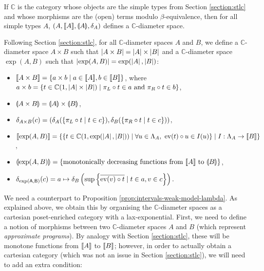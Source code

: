 \begin{example} If $\mathbb{C}$ is the category whose objects are the simple types from Section \ref{section:stlc} and whose morphisms are the (open) terms modulo $\beta$-equivalence, then for all simple types $A$, $(A, \llbracket A \rrbracket, \llparenthesis A \rrparenthesis, \delta_A)$ defines a $\mathbb{C}$-diameter space.
\end{example}

Following Section \ref{section:stlc}, for all $\mathbb{C}$-diameter spaces $A$ and $B$, we define a $\mathbb{C}$-diameter space $A \times B$ such that $\left\vert A \times B\right\vert = \left\vert A\right\vert \times \left\vert B\right\vert$ and a $\mathbb{C}$-diameter space $\exp(A,B)$ such that $\left\vert\exp(A,B)\right\vert = \exp(\left\vert A\right\vert,\left\vert B\right\vert)$: \begin{itemize}
\item $\llbracket A \times B \rrbracket = \{ a \times b \mid a \in \llbracket A \rrbracket, b \in \llbracket B \rrbracket \} $, where $a \times b = \{ t \in \mathbb{C}(1, \left\vert A\right\vert \times \left\vert B\right\vert) \mid \pi_L \circ t \in a \text{ and } \pi_R \circ t \in b \}$,
\item $\llparenthesis A \times B \rrparenthesis = \llparenthesis A \rrparenthesis \times \llparenthesis B \rrparenthesis$,
\item $\delta_{A \times B}(c) = (\delta_A(\{ \pi_L \circ t \mid t \in c \}), \delta_B(\{ \pi_R \circ t \mid t \in c \}))$,
\item $\llbracket \exp(A, B) \rrbracket = \{ \{ t \in \mathbb{C}(1, \exp(\left\vert A\right\vert, \left\vert B\right\vert)) \mid \forall u \in \Lambda_{A},~ \operatorname{ev}(t) \circ u \in I(u) \} \mid I : \Lambda_A \to \llbracket B \rrbracket \}$,
\item $\llparenthesis \exp(A, B) \rrparenthesis = \{ \text{monotonically decreasing functions from } \llbracket A \rrbracket \text{ to } \llparenthesis B \rrparenthesis \}$,
\item $\delta_\mathsf{\exp(A, B)}(c) = a \mapsto \delta_B\left(\sup\left\{\overline{\operatorname{ev}(v) \circ t} \mid t\in a, v \in c\right\}\right).$
\end{itemize}

We need a counterpart to Proposition \ref{prop:intervals-weak-model-lambda}. As explained above, we obtain this by organising the $\mathbb{C}$-diameter spaces as a cartesian poset-enriched category with a lax-exponential. First, we need to define a notion of morphisms between two $\mathbb{C}$-diameter spaces $A$ and $B$ (which represent \emph{approximate programs}). By analogy with Section \ref{section:stlc}, these will be monotone functions from $\llbracket A \rrbracket$ to $\llbracket B \rrbracket$; however, in order to actually obtain a cartesian category (which was not an issue in Section \ref{section:stlc}), we will need to add an extra condition:

